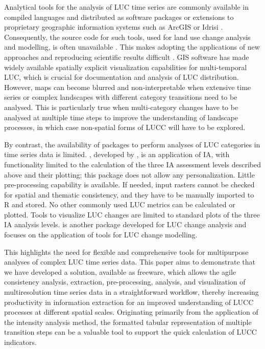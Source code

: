 Analytical tools for the analysis of LUC time series are commonly
available in compiled languages and distributed as software packages or
extensions to proprietary geographic information systems such as ArcGIS
or Idrisi \citep{Moulds2015}. Consequently, the source code for such
tools, used for land use change analysis and modelling, is often
unavailable \citep{Rosa2014}. This makes adopting the applications of
new approaches and reproducing scientific results difficult
\citep{Morin2012, Peng2011}. GIS software has made widely available
spatially explicit visualization capabilities for multi-temporal LUC,
which is crucial for documentation and analysis of LUC distribution.
However, maps can become blurred and non-interpretable when extensive
time series or complex landscapes with different category transitions
need to be analysed. This is particularly true when multi-category
changes have to be analysed at multiple time steps to improve the
understanding of landscape processes, in which case non-spatial forms of
LUCC will have to be explored.

By contrast, the availability of packages to perform analyses of LUC
categories in time series data is limited. , developed
by \citet{PontiusJr.2019}, is an application of IA, with functionality
limited to the calculation of the three IA assessment levels described
above and their plotting; this package does not allow any
personalization. Little pre-processing capability is available. If
needed, input rasters cannot be checked for spatial and thematic
consistency, and they have to be manually imported to R and stored. No
other commonly used LUC metrics can be calculated or plotted. Tools to
visualize LUC changes are limited to standard plots of the three IA
analysis levels.  \citep{Moulds2015} is another package developed
for LUC change analysis and focuses on the application of tools for LUC
change modelling.

This highlights the need for flexible and comprehensive tools for
multipurpose analyses of complex LUC time series data. This paper aims
to demonstrate that we have developed a solution, available as freeware,
which allows the agile consistency analysis, extraction, pre-processing,
analysis, and visualization of multiresolution time series data in a
straightforward workflow, thereby increasing productivity in information
extraction for an improved understanding of LUCC processes at different
spatial scales. Originating primarily from the application of the
intensity analysis method, the formatted tabular representation of
multiple transition steps can be a valuable tool to support the quick
calculation of LUCC indicators.

